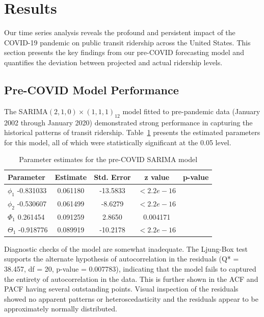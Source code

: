 \documentclass[11pt]{article}
\begin{document}
\section{Results}

Our time series analysis reveals the profound and persistent impact of the COVID-19 pandemic on public transit ridership across the United States. This section presents the key findings from our pre-COVID forecasting model and quantifies the deviation between projected and actual ridership levels.

\subsection{Pre-COVID Model Performance}

The SARIMA$(2,1,0)\times(1,1,1)_{12}$ model fitted to pre-pandemic data (January 2002 through January 2020) demonstrated strong performance in capturing the historical patterns of transit ridership. Table~\ref{t:model_params} presents the estimated parameters for this model, all of which were statistically significant at the 0.05 level.

\begin{table}[!ht]
\caption{Parameter estimates for the pre-COVID SARIMA model}
\label{t:model_params}
\begin{center}
\begin{tabular}{lcccc}
\hline
Parameter & Estimate & Std. Error & z value & p-value \\
\hline
$\phi_1$   -0.831033 &  0.061180 & -13.5833 & $< 2.2e-16$ \\
$\phi_2$   -0.530607 &  0.061499 &  -8.6279 & $< 2.2e-16$ \\
$\Phi_1$    0.261454 &  0.091259 &   2.8650 &  0.004171   \\
$\Theta_1$ -0.918776 &  0.089919 & -10.2178 & $< 2.2e-16$ \\
\hline
\end{tabular}
\end{center}
\end{table}

Diagnostic checks of the model are somewhat inadequate. The Ljung-Box test supports the alternate hypothesis of autocorrelation in the residuals (Q* = 38.457, df = 20, p-value = 0.007783), indicating that the model fails to captured the entirety of autocorrelation in the data. This is further shown in the ACF and PACF having several outstanding points. Visual inspection of the residuals showed no apparent patterns or heteroscedasticity and the residuals appear to be approximately normally distributed.
\end{document}
